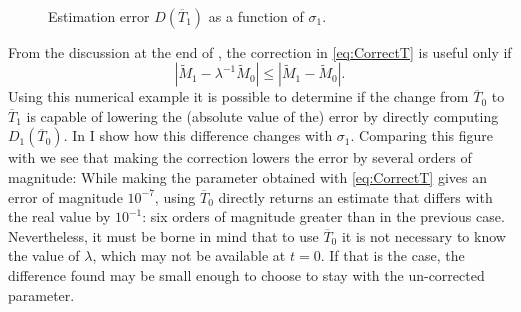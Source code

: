 \documentclass[english, a4paper,12pt]{article}
\begin{document}
	\begin{figure}[H] 
		\caption{Estimation error $D(\overline{T}_{1})$ as a function of $\sigma_{1}$.}
		\label{fig:CategoryDiff1Plot}
		\,
	\end{figure}
From the discussion at the end of , the correction in \eqref{eq:CorrectT} is useful only if
	$$\left|\tilde{M}_{1} - \lambda^{-1}\tilde{M}_{0} \right|
			\leq \left|\tilde{M}_{1} - \tilde{M}_{0} \right|.$$
Using this numerical example it is possible to determine if the change from $\overline{T}_{0}$ to $\overline{T}_{1}$ is capable of lowering the (absolute value of the) error by directly computing $D_{1}(\overline{T}_{0})$. In  I show how this difference changes with $\sigma_{1}$. Comparing this figure with  we see that making the correction lowers the error by several orders of magnitude: While making the parameter obtained with \eqref{eq:CorrectT} gives an error of magnitude $10^{-7}$, using $\overline{T}_{0}$ directly returns an estimate that differs with the real value by $10^{-1}$: six orders of magnitude greater than in the previous case. Nevertheless, it must be borne in mind that to use $\overline{T}_{0}$ it is not necessary to know the value of $\lambda$, which may not be available at $t = 0$. If that is the case, the difference found may be small enough to choose to stay with the un-corrected parameter.
\end{document}
